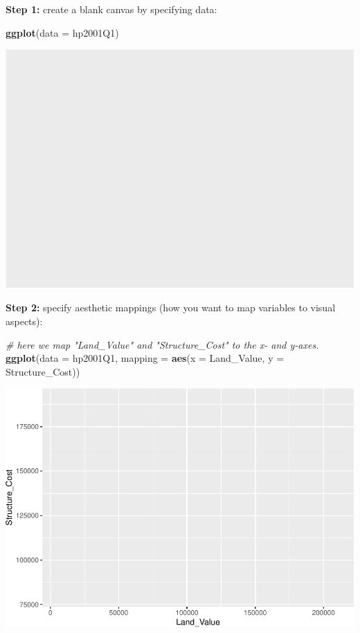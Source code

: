 \documentclass[
]{book}
\newenvironment{Shaded}{\begin{snugshade}}{\end{snugshade}}
\newcommand{\CommentTok}[1]{\textcolor[rgb]{0.56,0.35,0.01}{\textit{#1}}}
\newcommand{\DataTypeTok}[1]{\textcolor[rgb]{0.13,0.29,0.53}{#1}}
\newcommand{\KeywordTok}[1]{\textcolor[rgb]{0.13,0.29,0.53}{\textbf{#1}}}
\newcommand{\NormalTok}[1]{#1}
\begin{document}
\textbf{Step 1:} create a blank canvas by specifying data:

\begin{Shaded}
\begin{Highlighting}[]
\KeywordTok{ggplot}\NormalTok{(}\DataTypeTok{data =}\NormalTok{ hp2001Q1)}
\end{Highlighting}
\end{Shaded}

\includegraphics{R/Rgraphics/figures/unnamed-chunk-142-1.pdf}

\textbf{Step 2:} specify aesthetic mappings (how you want to map variables to visual aspects):

\begin{Shaded}
\begin{Highlighting}[]
\CommentTok{\# here we map "Land\_Value" and "Structure\_Cost" to the x{-} and y{-}axes.}
\KeywordTok{ggplot}\NormalTok{(}\DataTypeTok{data =}\NormalTok{ hp2001Q1, }\DataTypeTok{mapping =} \KeywordTok{aes}\NormalTok{(}\DataTypeTok{x =}\NormalTok{ Land\_Value, }\DataTypeTok{y =}\NormalTok{ Structure\_Cost))}
\end{Highlighting}
\end{Shaded}

\includegraphics{R/Rgraphics/figures/unnamed-chunk-143-1.pdf}
\end{document}
